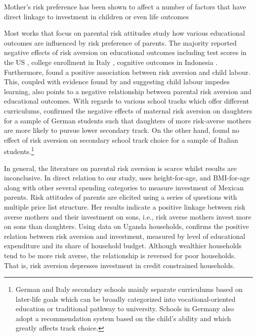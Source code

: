 \documentclass[]{article}
\begin{document}
\alert{Mother's risk preference has been shown to affect a number of factors that have direct linkage to investment in children or even life outcomes}

Most works that focus on parental risk attitudes study how various educational outcomes are influenced by risk preference of parents. The majority reported negative effects of risk aversion on educational outcomes including test scores in the US \citep{brown2012parental}, college enrollment in Italy \citep{checchi2014parents}, cognitive outcomes in Indonesia \citep{hartarto2023parental}. Furthermore, \citet{frempong2021risk} found a positive association between risk aversion and child labour. This, coupled with evidence found by \citet{HEADY2003385} and \citet{bezerra2009impact} suggesting child labour impedes learning, also points to a negative relationship between parental risk aversion and educational outcomes. With regards to various school tracks which offer different curriculums, \citet{wolfel2012parental} confirmed the negative effects of maternal risk aversion on daughters for a sample of German students such that daughters of more risk-averse mothers are more likely to pursue lower secondary track. On the other hand, \citet{leonardi2007parents} found no effect of risk aversion on secondary school track choice for a sample of Italian students.\footnote{German and Italy secondary schools mainly separate curriculums based on later-life goals which can be broadly categorized into vocational-oriented education or traditional pathway to university. Schools in Germany also adopt a recommendation system based on the child's ability and which greatly affects track choice.}

In general, the literature on parental risk aversion is scarce whilst results are inconclusive. In direct relation to our study, \citet{sovero2018risk} uses height-for-age, and BMI-for-age along with other several spending categories to measure investment of Mexican parents. Risk attitudes of parents are elicited using a series of questions with multiple price list structure. Her results indicate a positive linkage between risk averse mothers and their investment on sons, i.e., risk averse mothers invest more on sons than daughters. Using data on Uganda households, \citet{tabetando2019parental} confirms the positive relation between risk aversion and investment, measured by level of educational expenditure and its share of household budget. Although wealthier households tend to be more risk averse, the relationship is reversed for poor households. That is, risk aversion depresses investment in credit constrained households.      
\end{document}
